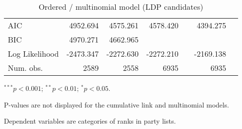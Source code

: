 \begin{table}[htbp]
\begin{center}
{\begin{threeparttable}
\begin{tabular}{l D{.}{.}{5.6} D{.}{.}{5.6} D{.}{.}{5.4} D{.}{.}{2.4} D{.}{.}{5.4} D{.}{.}{2.4}}
AIC                         & 4952.694               & 4575.261                & 4578.420                &                       & 4394.275                &                       \\
BIC                         & 4970.271               & 4662.965                &                         &                       &                         &                       \\
Log Likelihood              & -2473.347              & -2272.630               & -2272.210               &                       & -2169.138               &                       \\
Num. obs.                   & 2589                   & 2558                    & 6935                    &                       & 6935                    &                       \\
\bottomrule
\end{tabular}
\begin{tablenotes}[flushleft]
\scriptsize{
\item $^{***}p<0.001$; $^{**}p<0.01$; $^{*}p<0.05$.\item P-values are not displayed for the cumulative link and multinomial models.
\item Dependent variables are categories of ranks in party lists.}
\end{tablenotes}
\end{threeparttable}
}
\caption{Ordered / multinomial model (LDP candidates)}
\label{table:coefChoiceLDP}
\end{center}
\end{table}

